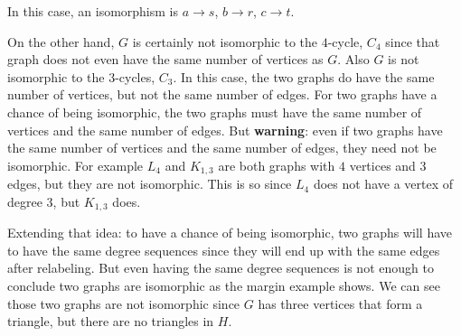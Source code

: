 In this case, an isomorphism is $a\to s$, $b\to r$, $c\to t$. 

On the other hand, $G$ is certainly not isomorphic to the $4$-cycle, $C_{4}$ since that graph does not even have the same number of vertices as $G$. Also $G$ is not isomorphic to the $3$-cycles, $C_{3}$. In this case, the two graphs do have the same number of vertices, but not the same number of edges.  For two graphs have a chance of being isomorphic, the two graphs must have the same number of vertices and the same number of edges. 
 But {\bfseries warning}: even if two graphs have the same number of vertices and the same number of edges, they need not be isomorphic.  For example $L_4$ and $K_{1,3}$ are both graphs with $4$ vertices and $3$ edges, but 
they are not isomorphic. This is so since $L_{4}$ does not have a vertex of degree $3$, but $K_{1,3}$ does.

 Extending that idea: to have a chance of being isomorphic, two graphs will have to have the same degree sequences since they will end up with the same edges after relabeling. But even having the same degree sequences is not enough to conclude two graphs are isomorphic as the margin example shows. We can see those two graphs are not isomorphic since $G$ has three vertices that form a triangle, but there are no triangles in $H$.

